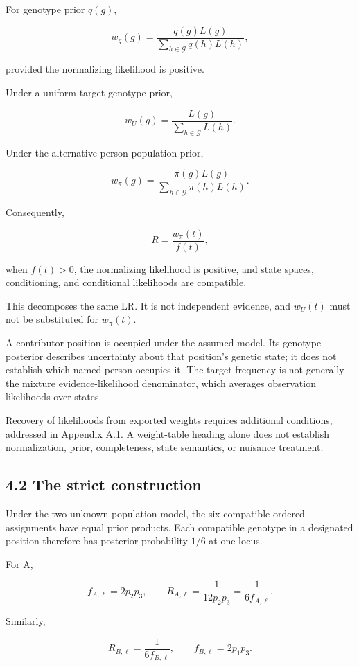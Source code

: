 \documentclass[
]{article}
\begin{document}
For genotype prior \(q(g)\),

\[
w_q(g)=
\frac{q(g)L(g)}
{\sum_{h\in\mathcal G}q(h)L(h)},
\]

provided the normalizing likelihood is positive.

Under a uniform target-genotype prior,

\[
w_U(g)=\frac{L(g)}{\sum_{h\in\mathcal G}L(h)}.
\]

Under the alternative-person population prior,

\[
w_\pi(g)=
\frac{\pi(g)L(g)}
{\sum_{h\in\mathcal G}\pi(h)L(h)}.
\]

Consequently,

\[
R=\frac{w_\pi(t)}{f(t)},
\]

when \(f(t)>0\), the normalizing likelihood is positive, and state
spaces, conditioning, and conditional likelihoods are compatible.

This decomposes the same LR. It is not independent evidence, and
\(w_U(t)\) must not be substituted for \(w_\pi(t)\).

A contributor position is occupied under the assumed model. Its genotype
posterior describes uncertainty about that position's genetic state; it
does not establish which named person occupies it. The target frequency
is not generally the mixture evidence-likelihood denominator, which
averages observation likelihoods over states.

Recovery of likelihoods from exported weights requires additional
conditions, addressed in Appendix A.1. A weight-table heading alone does
not establish normalization, prior, completeness, state semantics, or
nuisance treatment.

\subsection{4.2 The strict construction}\label{the-strict-construction}

Under the two-unknown population model, the six compatible ordered
assignments have equal prior products. Each compatible genotype in a
designated position therefore has posterior probability \(1/6\) at one
locus.

For A,

\[
f_{A,\ell}=2p_2p_3,
\qquad
R_{A,\ell}=\frac{1}{12p_2p_3}
=\frac{1}{6f_{A,\ell}}.
\]

Similarly,

\[
R_{B,\ell}=\frac{1}{6f_{B,\ell}},
\qquad
f_{B,\ell}=2p_1p_3.
\]
\end{document}

